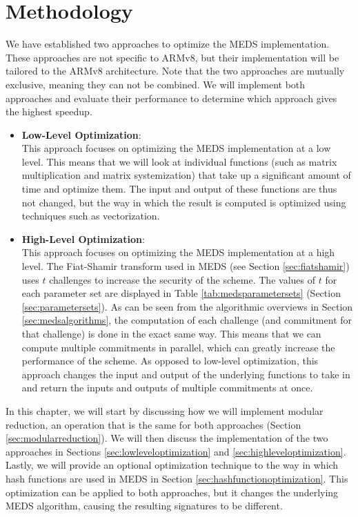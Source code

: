 \documentclass[11pt,a4paper]{report}
\theoremstyle{definition}
\begin{document}
\chapter{Methodology}
\label{ch:methodology}
We have established two approaches to optimize the MEDS implementation. These approaches are not specific to ARMv8, but their implementation will be tailored to the ARMv8 architecture. Note that the two approaches are mutually exclusive, meaning they can not be combined. We will implement both approaches and evaluate their performance to determine which approach gives the highest speedup.
\begin{itemize}
  \item \textbf{Low-Level Optimization}:\\
  This approach focuses on optimizing the MEDS implementation at a low level. This means that we will look at individual functions (such as matrix multiplication and matrix systemization) that take up a significant amount of time and optimize them. The input and output of these functions are thus not changed, but the way in which the result is computed is optimized using techniques such as vectorization.
  \item \textbf{High-Level Optimization}:\\
  This approach focuses on optimizing the MEDS implementation at a high level. The Fiat-Shamir transform used in MEDS (see Section \ref{sec:fiatshamir}) uses $t$ challenges to increase the security of the scheme. The values of $t$ for each parameter set are displayed in Table \ref{tab:medsparametersets} (Section \ref{sec:parametersets}). As can be seen from the algorithmic overviews in Section \ref{sec:medsalgorithms}, the computation of each challenge (and commitment for that challenge) is done in the exact same way. This means that we can compute multiple commitments in parallel, which can greatly increase the performance of the scheme. As opposed to low-level optimization, this approach changes the input and output of the underlying functions to take in and return the inputs and outputs of multiple commitments at once.
\end{itemize}
In this chapter, we will start by discussing how we will implement modular reduction, an operation that is the same for both approaches (Section \ref{sec:modularreduction}). We will then discuss the implementation of the two approaches in Sections \ref{sec:lowleveloptimization} and \ref{sec:highleveloptimization}. Lastly, we will provide an optional optimization technique to the way in which hash functions are used in MEDS in Section \ref{sec:hashfunctionoptimization}. This optimization can be applied to both approaches, but it changes the underlying MEDS algorithm, causing the resulting signatures to be different.
\end{document}
